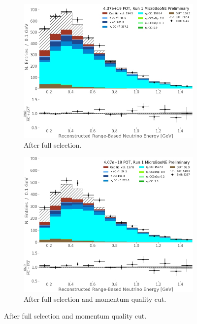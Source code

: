 \begin{figure}[ht] 
\begin{center}
    \begin{subfigure}[b]{0.45\textwidth}
    \centering
    \includegraphics[width=1.00\textwidth]{NuMuCCsel/Images/Ryan/Run1_recoErange_fullSel.jpg}
    \caption{\label{fig:NuMUCCsel:ryan:noPQuality} After full selection.}
    \end{subfigure}
    \begin{subfigure}[b]{0.45\textwidth}
    \centering
    \includegraphics[width=1.00\textwidth]{NuMuCCsel/Images/Ryan/Run1_recoErange_FullSel_pquality.jpg}
    \caption{\label{fig:NuMUCCsel:ryan:withPQuality} After full selection and momentum quality cut.}

\end{subfigure}
\end{center}
\end{figure}
